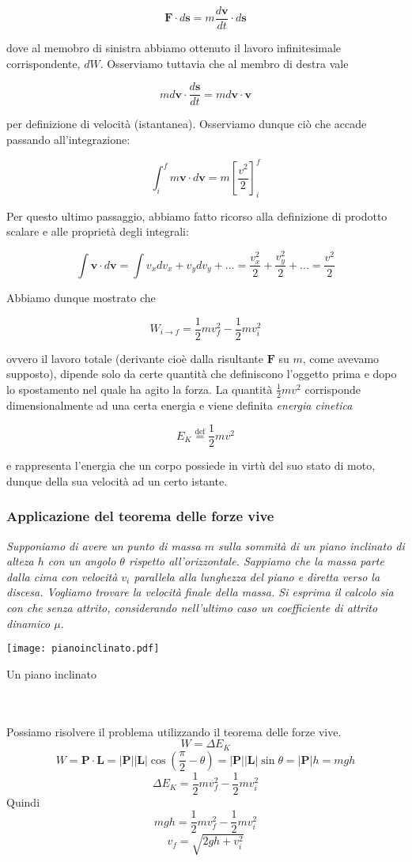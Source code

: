 \[ \mathbf{F} \cdot d\mathbf{s} = m \frac{d\mathbf{v}}{dt} \cdot d\mathbf{s} \]

\noindent dove al memobro di sinistra abbiamo ottenuto il lavoro
infinitesimale corrispondente, $dW$. Osserviamo tuttavia che
al membro di destra vale

\[ m d\mathbf{v} \cdot \frac{d\mathbf{s}}{dt} = m d\mathbf{v} \cdot \mathbf{v} \]

\noindent per definizione di velocità (istantanea). Osserviamo
dunque ciò che accade passando all'integrazione:

\[ \int_{i}^{f} m \mathbf{v} \cdot d\mathbf{v} = m \left[\frac{v^2}{2}\right]_{i}^{f} \]

\noindent Per questo ultimo passaggio, abbiamo fatto ricorso alla
definizione di prodotto scalare e alle proprietà degli integrali:

\[ \int \mathbf{v} \cdot d\mathbf{v} = \int v_x dv_x + v_y dv_y + ... = \frac{v_x^2}{2} + \frac{v_y^2}{2} + ... = \frac{v^2}{2} \]

\noindent Abbiamo dunque mostrato che

\[ W_{i \to f} = \frac{1}{2}mv_f^2 - \frac{1}{2}mv_i^2 \]

\noindent ovvero il lavoro totale (derivante cioè dalla risultante
$\mathbf{F}$ su $m$, come avevamo supposto), dipende solo da
certe quantità che definiscono l'oggetto prima e dopo lo spostamento
nel quale ha agito la forza. La quantità $\frac12mv^2$ corrisponde
dimensionalmente ad una certa energia e viene definita
\textit{energia cinetica}

\[ E_K \stackrel{\text{def}}{=} \frac{1}{2}mv^2 \]

\noindent e rappresenta l'energia che un corpo possiede in
virtù del suo stato di moto, dunque della sua velocità ad un
certo istante.



\subsubsection*{Applicazione del teorema delle forze vive}
\textit{Supponiamo di avere un punto di massa $m$ sulla sommità di un piano
inclinato di alteza $h$ con un angolo $\theta$ rispetto all'orizzontale. Sappiamo
che la massa parte dalla cima con velocità $v_i$ parallela alla lunghezza del piano
e diretta verso la discesa. Vogliamo trovare la velocità finale della massa. Si
esprima il calcolo sia con che senza attrito, considerando nell'ultimo caso un
coefficiente di attrito dinamico $\mu$.}
\begin{marginfigure}
    \centering
    \texttt{[image: pianoinclinato.pdf]}
    \caption{Un piano inclinato}
\end{marginfigure}
\\\\
Possiamo risolvere il problema utilizzando il teorema delle forze vive.
\[ W = \Delta E_K \]
\[ W = \mathbf{P}\cdot\mathbf{L} = |\mathbf{P}||\mathbf{L}|\cos\left(\frac{\pi}{2} - \theta\right) = |\mathbf{P}||\mathbf{L}|\sin\theta = |\mathbf{P}|h = mgh \]
\[ \Delta E_K = \frac12mv_f^2 - \frac12mv_i^2 \]
Quindi
\[ mgh = \frac12mv_f^2 - \frac12mv_i^2 \]
\[ v_f = \sqrt{2gh + v_i^2} \]

